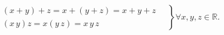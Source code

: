 \documentclass[12pt]{article}
\begin{document}
$$
\left .{\begin{matrix}(x+y)+z=x+(y+z)=x+y+z\quad \\(x\,y)z=x(y\,z)=x\,y\,z\qquad \qquad \qquad \quad \ \ \,\end{matrix}}\right \}\forall x,y,z\in {\mathbb  {R}}.
$$
\end{document}
